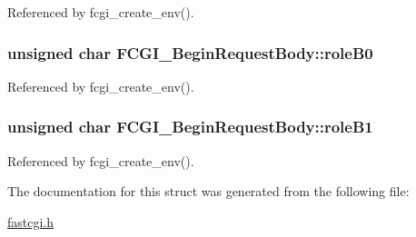 Referenced by fcgi\-\_\-create\-\_\-env().

\hypertarget{structFCGI__BeginRequestBody_abaa663440aaab2d668f7c22083a5366e}{
\subsubsection[{role\-B0}]{\setlength{\rightskip}{0pt plus 5cm}unsigned char F\-C\-G\-I\-\_\-\-Begin\-Request\-Body\-::role\-B0}}\label{structFCGI__BeginRequestBody_abaa663440aaab2d668f7c22083a5366e}


Referenced by fcgi\-\_\-create\-\_\-env().

\hypertarget{structFCGI__BeginRequestBody_a217f1ebe37176c39018fa2ad62d8ccd7}{
\subsubsection[{role\-B1}]{\setlength{\rightskip}{0pt plus 5cm}unsigned char F\-C\-G\-I\-\_\-\-Begin\-Request\-Body\-::role\-B1}}\label{structFCGI__BeginRequestBody_a217f1ebe37176c39018fa2ad62d8ccd7}


Referenced by fcgi\-\_\-create\-\_\-env().



The documentation for this struct was generated from the following file\-:\begin{DoxyCompactItemize}
\item 
\hyperlink{fastcgi_8h}{fastcgi.\-h}\end{DoxyCompactItemize}
